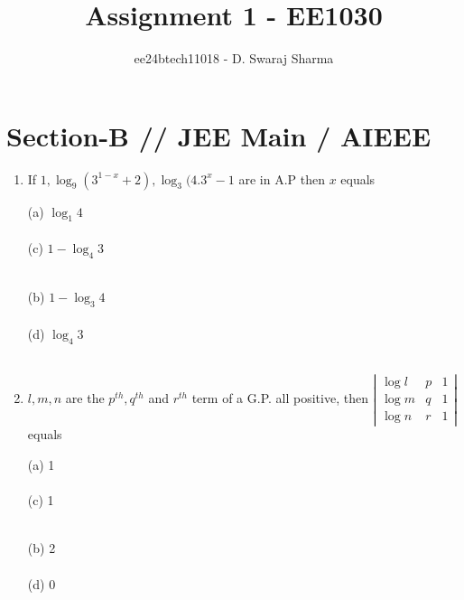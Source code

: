 \documentclass[journal,12pt,twocolumn]{IEEEtran}
\theoremstyle{remark}
\begin{document}

\vspace{3cm}

\title{Assignment 1 - EE1030}
\author{ee24btech11018 - D. Swaraj Sharma}
\maketitle
\newpage
\bigskip

\renewcommand{\thefigure}{\theenumi}
\renewcommand{\thetable}{\theenumi}

\section*{\textbf{Section-B} // \textbf{JEE Main} / \textbf{AIEEE}}

\begin{enumerate}[label=\textcolor{magenta}{\arabic*.}]
\newcommand{\question}[6]{
	 #1  \textcolor {magenta}{\rightline{#2\quad}} \\ 
\begin{minipage}{0.2\textwidth}
(a) #3 \\ \\
(c) #5 \\ \\
\end{minipage}
\hfill
\begin{minipage}{0.2\textwidth}
(b) #4 \\ \\
(d) #6 \\ \\
\end{minipage}

}
\newcommand{\questionb}[6]{
	 #1  \textcolor {magenta}{\rightline{#2\quad}} \\ 
(a) #3 \\ \\
(b) #4 \\ \\
(c) #5 \\ \\
(d) #6 \\ \\

}

\item \question{If $ 1, \log_9 (3^{1-x} +2), \log_3 (4.3^x -1$ are in A.P then $x$ equals}{[2002]}
  {$\log_1 4$}
  {$1-\log_3 4$}
  {$1-\log_4 3$}
  {$\log_4 3$}

\item \question{$l, m, n$ are the $p^{th}, q^{th}$ and $r^{th}$ term of a G.P. all positive, then $\left|\begin{matrix} \log l & p & 1 \\ \log m & q & 1 \\ \log n & r & 1 \end{matrix}\right|$ equals}{[2002]}
{1}
{2}
{1}
{0}


\end{enumerate}
\end{document}
